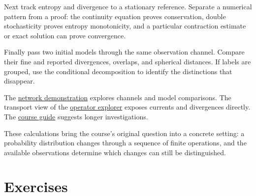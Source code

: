 \documentclass[11pt,oneside,openany]{book}
\theoremstyle{definition}
\theoremstyle{remark}
\numberwithin{equation}{chapter}
\begin{document}
Next track entropy and divergence to a stationary reference. Separate a numerical pattern from a proof: the continuity equation proves conservation, double stochasticity proves entropy monotonicity, and a particular contraction estimate or exact solution can prove convergence.

Finally pass two initial models through the same observation channel. Compare their fine and reported divergences, overlaps, and spherical distances. If labels are grouped, use the conditional decomposition to identify the distinctions that disappear.

The \href{https://bobovski66.github.io/IntroDiscreteInfoGeom/demos/week10.html}{network demonstration} explores channels and model comparisons. The transport view of the \href{https://bobovski66.github.io/IntroDiscreteInfoGeom/demos/operator-explorer.html}{operator explorer} exposes currents and divergences directly. The \href{https://bobovski66.github.io/IntroDiscreteInfoGeom/guide.html\#capstone}{course guide} suggests longer investigations.

These calculations bring the course's original question into a concrete setting: a probability distribution changes through a sequence of finite operations, and the available observations determine which changes can still be distinguished.

\section{Exercises}\label{ch10-exercises}
\end{document}
